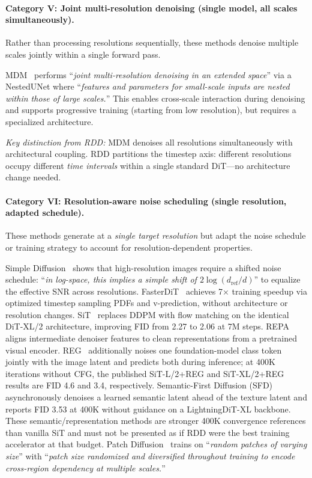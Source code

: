 \documentclass[10pt]{article}
\begin{document}
\paragraph{Category V: Joint multi-resolution denoising (single model, all scales simultaneously).}
Rather than processing resolutions sequentially, these methods denoise multiple scales jointly within a single forward pass.

MDM~\citep{gu2024mdm} performs ``\emph{joint multi-resolution denoising in an extended space}'' via a NestedUNet where ``\emph{features and parameters for small-scale inputs are nested within those of large scales.}''
This enables cross-scale interaction during denoising and supports progressive training (starting from low resolution), but requires a specialized architecture.

\emph{Key distinction from RDD:} MDM denoises all resolutions simultaneously with architectural coupling. RDD partitions the timestep axis: different resolutions occupy different \emph{time intervals} within a single standard DiT---no architecture change needed.

\paragraph{Category VI: Resolution-aware noise scheduling (single resolution, adapted schedule).}
These methods generate at a \emph{single target resolution} but adapt the noise schedule or training strategy to account for resolution-dependent properties.

Simple Diffusion~\citep{hoogeboom2023simple} shows that high-resolution images require a shifted noise schedule: ``\emph{in log-space, this implies a simple shift of $2\log(d_{\text{ref}}/d)$}'' to equalize the effective SNR across resolutions.
FasterDiT~\citep{fasterdit2024} achieves 7$\times$ training speedup via optimized timestep sampling PDFs and v-prediction, without architecture or resolution changes.
SiT~\citep{ma2024sit} replaces DDPM with flow matching on the identical DiT-XL/2 architecture, improving FID from 2.27 to 2.06 at 7M steps.
REPA~\citep{yu2025repa} aligns intermediate denoiser features to clean representations from a pretrained visual encoder. REG~\citep{wu2025reg} additionally noises one foundation-model class token jointly with the image latent and predicts both during inference; at 400K iterations without CFG, the published SiT-L/2+REG and SiT-XL/2+REG results are FID 4.6 and 3.4, respectively. Semantic-First Diffusion (SFD)~\citep{pan2026sfd} asynchronously denoises a learned semantic latent ahead of the texture latent and reports FID 3.53 at 400K without guidance on a LightningDiT-XL backbone. These semantic/representation methods are stronger 400K convergence references than vanilla SiT and must not be presented as if RDD were the best training accelerator at that budget.
Patch Diffusion~\citep{wang2023patch} trains on ``\emph{random patches of varying size}'' with ``\emph{patch size randomized and diversified throughout training to encode cross-region dependency at multiple scales.}''
\end{document}
